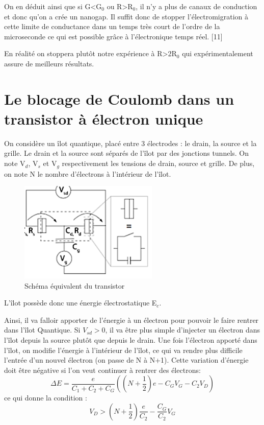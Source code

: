 On en déduit ainsi que si G<G${_0}$ ou R>R${_0}$, il n'y a plus de canaux de conduction et donc qu'on a crée un nanogap. Il suffit donc de stopper l'électromigration à cette limite de conductance dans un temps très court de l'ordre de la microseconde ce qui est possible grâce à l'électronique temps réel. [11]

En réalité on stoppera plutôt notre expérience à R>2R${_0}$ qui expérimentalement assure de meilleurs résultats.

\section{Le blocage de Coulomb dans un transistor à électron unique}
On considère un îlot quantique, placé entre 3 électrodes : le drain, la source et la grille. Le drain et la source sont séparés de l'îlot par des jonctions tunnels. On note V${_d}$, V${_s}$ et V${_g}$ respectivement les tensions de drain, source et grille. De plus, on note N le nombre d'électrons à l'intérieur de l'îlot. 
\begin{figure}[h]
    \begin{center}
        \includegraphics[width=250px]{Images/Blocage_Coulomb_Schema}
        \caption{Schéma équivalent du transistor}
        \label{fig:}
    \end{center}
\end{figure}

L'îlot possède donc une énergie électrostatique E${_c}$.

Ainsi, il va falloir apporter de l'énergie à un électron pour pouvoir le faire rentrer dans l'îlot Quantique. Si $V_{sd}>0$, il va être plus simple  d'injecter un électron dans l'îlot depuis la source plutôt que depuis le drain. Une fois l'électron apporté dans l'îlot, on modifie l'énergie à l'intérieur de l'îlot, ce qui va rendre plus difficile l'entrée d'un nouvel électron (on passe de N à N+1). Cette variation d'énergie doit être négative si l'on veut continuer à rentrer des électrons:
\[\Delta E = \frac{e}{C_1 + C_2 + C_G}\left((N + \frac{1}{2})e - C_G V_G - C_2 V_D\right)\]
ce qui donne la condition :
\[V_D > (N + \frac{1}{2})\frac{e}{C_2} - \frac{C_G}{C_2}V_G\]

